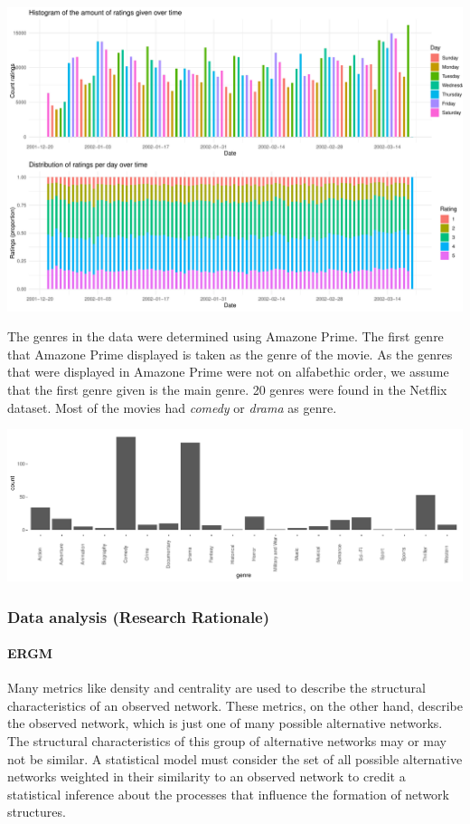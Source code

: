 \documentclass[
  english,
  man,floatsintext]{apa6}
\let\oldparagraph\paragraph
\renewcommand{\paragraph}[1]{\oldparagraph{#1}\mbox{}}
\begin{document}
\includegraphics{SNA4DSprojectReport_files/figure-latex/unnamed-chunk-5-1.pdf}

The genres in the data were determined using Amazone Prime. The first genre that Amazone Prime displayed is taken as the genre of the movie. As the genres that were displayed in Amazone Prime were not on alfabethic order, we assume that the first genre given is the main genre. 20 genres were found in the Netflix dataset. Most of the movies had \emph{comedy} or \emph{drama} as genre.

\includegraphics{SNA4DSprojectReport_files/figure-latex/unnamed-chunk-6-1.pdf}

\hypertarget{data-analysis-research-rationale}{%
\subsubsection{Data analysis (Research Rationale)}\label{data-analysis-research-rationale}}

\hypertarget{ergm}{%
\paragraph{ERGM}\label{ergm}}

Many metrics like density and centrality are used to describe the structural characteristics of an observed network. These metrics, on the other hand, describe the observed network, which is just one of many possible alternative networks. The structural characteristics of this group of alternative networks may or may not be similar. A statistical model must consider the set of all possible alternative networks weighted in their similarity to an observed network to credit a statistical inference about the processes that influence the formation of network structures.
\end{document}
